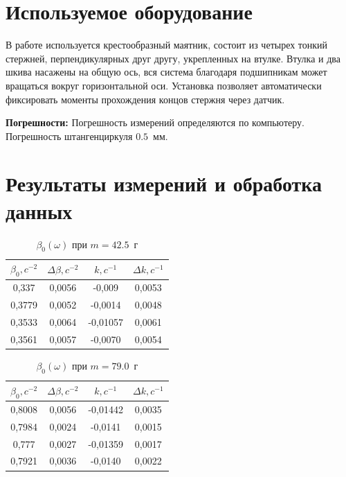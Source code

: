 \documentclass[a4paper,12pt]{article} %
\begin{document}
\section{Используемое оборудование}
В работе используется крестообразный маятник, состоит из четырех тонкий стержней, перпендикулярных друг другу, укрепленных на втулке. Втулка и два шкива насажены на общую ось, вся система благодаря подшипникам может вращаться вокруг горизонтальной оси. Установка позволяет автоматически фиксировать моменты прохождения концов стержня через датчик.

\textbf{Погрешности:}\newline
Погрешность измерений определяются по компьютеру. Погрешность штангенциркуля $ 0.5 $~мм.
\section{Результаты измерений и обработка данных}
\begin{table}[!ht]
    \centering
    \begin{tabular}{|c|c|c|c|}
    \hline
        $\beta_0, c^{-2}$ & $\Delta \beta, c^{-2}$ & $k, c^{-1}$ & $\Delta k, c^{-1}$ \\ \hline
        0,337 & 0,0056 & -0,009 & 0,0053 \\ \hline
        0,3779 & 0,0052 & -0,0014 & 0,0048 \\ \hline
        0,3533 & 0,0064 & -0,01057 & 0,0061 \\ \hline
        0,3561 & 0,0057 & -0,0070 & 0,0054  \\ \hline
    \end{tabular}
    \caption{$\beta_0(\omega)$ при $m=42.5$~г}
\end{table}
\begin{table}[!ht]
    \centering
    \begin{tabular}{|c|c|c|c|}
    \hline
        $\beta_0, c^{-2}$ & $\Delta \beta, c^{-2} $& $k, c^{-1}$ & $\Delta k, c^{-1}$ \\ \hline
        0,8008 & 0,0056 & -0,01442 & 0,0035  \\ \hline
        0,7984 & 0,0024 & -0,0141 & 0,0015  \\ \hline
        0,777 & 0,0027 & -0,01359 & 0,0017  \\ \hline
        0,7921 & 0,0036 & -0,0140 & 0,0022  \\ \hline
    \end{tabular}
    \caption{$\beta_0(\omega)$ при $m=79.0$~г}
\end{table}
\end{document}
